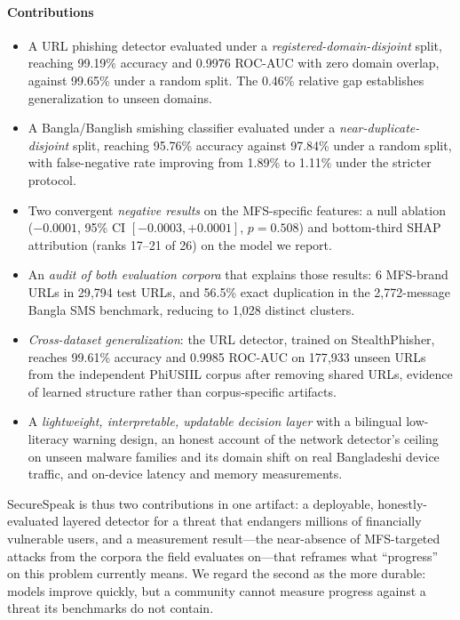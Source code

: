 \documentclass[manuscript,screen,review]{acmart}
\begin{document}
\paragraph{Contributions}
\begin{itemize}
\item A URL phishing detector evaluated under a \emph{registered-domain-disjoint} split, reaching 99.19\% accuracy and 0.9976 ROC-AUC with zero domain overlap, against 99.65\% under a random split. The 0.46\% relative gap establishes generalization to unseen domains.
\item A Bangla/Banglish smishing classifier evaluated under a \emph{near-duplicate-disjoint} split, reaching 95.76\% accuracy against 97.84\% under a random split, with false-negative rate improving from 1.89\% to 1.11\% under the stricter protocol.
\item Two convergent \emph{negative results} on the MFS-specific features: a null ablation ($-0.0001$, 95\% CI $[-0.0003, +0.0001]$, $p=0.508$) and bottom-third SHAP attribution (ranks 17--21 of 26) on the model we report.
\item An \emph{audit of both evaluation corpora} that explains those results: 6 MFS-brand URLs in 29{,}794 test URLs, and 56.5\% exact duplication in the 2{,}772-message Bangla SMS benchmark, reducing to 1{,}028 distinct clusters.
\item \emph{Cross-dataset generalization}: the URL detector, trained on StealthPhisher, reaches 99.61\% accuracy and 0.9985 ROC-AUC on 177{,}933 unseen URLs from the independent PhiUSIIL corpus after removing shared URLs, evidence of learned structure rather than corpus-specific artifacts.
\item A \emph{lightweight, interpretable, updatable decision layer} with a bilingual low-literacy warning design, an honest account of the network detector's ceiling on unseen malware families and its domain shift on real Bangladeshi device traffic, and on-device latency and memory measurements.
\end{itemize}

SecureSpeak is thus two contributions in one artifact: a deployable, honestly-evaluated layered detector for a threat that endangers millions of financially vulnerable users, and a measurement result---the near-absence of MFS-targeted attacks from the corpora the field evaluates on---that reframes what ``progress'' on this problem currently means. We regard the second as the more durable: models improve quickly, but a community cannot measure progress against a threat its benchmarks do not contain.
\end{document}
